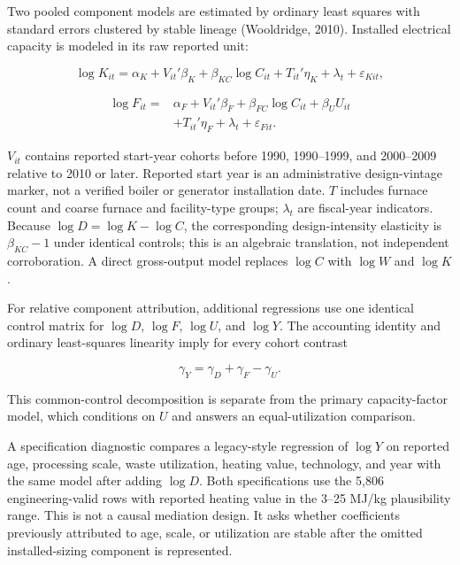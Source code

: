 \documentclass[11pt,letterpaper]{article}
\begin{document}
Two pooled component models are estimated by ordinary least squares with
standard errors clustered by stable lineage (Wooldridge, 2010). Installed
electrical capacity is modeled in its raw reported unit:

\begin{equation}
\log K_{it}=\alpha_K+V_{it}'\beta_K
+\beta_{KC}\log C_{it}+T_{it}'\eta_K
+\lambda_t+\varepsilon_{Kit},
\label{eq:design-model}
\end{equation}

\begin{equation}
\begin{split}
\log F_{it}={}&\alpha_F+V_{it}'\beta_F
+\beta_{FC}\log C_{it}+\beta_U U_{it}\\
&+T_{it}'\eta_F+\lambda_t+\varepsilon_{Fit}.
\end{split}
\label{eq:factor-model}
\end{equation}

$V_{it}$ contains reported start-year cohorts before 1990,
1990--1999, and 2000--2009 relative to 2010 or later. Reported start year is an
administrative design-vintage marker, not a verified boiler or generator
installation date. $T$ includes furnace count and coarse furnace and
facility-type groups; $\lambda_t$ are fiscal-year indicators. Because
$\log D=\log K-\log C$, the corresponding design-intensity elasticity is
$\beta_{KC}-1$ under identical controls; this is an algebraic translation, not
independent corroboration. A direct gross-output model replaces $\log C$ with
$\log W$ and $\log K$.

For relative component attribution, additional regressions use one identical
control matrix for $\log D$, $\log F$, $\log U$, and $\log Y$. The accounting
identity and ordinary least-squares linearity imply for every cohort contrast

\begin{equation}
\gamma_Y=\gamma_D+\gamma_F-\gamma_U.
\label{eq:common-component}
\end{equation}

This common-control decomposition is separate from the primary capacity-factor
model, which conditions on $U$ and answers an equal-utilization comparison.

A specification diagnostic compares a legacy-style regression of $\log Y$ on
reported age, processing scale, waste utilization, heating value, technology,
and year with the same model after adding $\log D$. Both specifications use the
5,806 engineering-valid rows with reported heating value in the 3--25 MJ/kg
plausibility range. This is not a causal mediation design. It asks whether
coefficients previously attributed to age, scale, or utilization are stable
after the omitted installed-sizing component is represented.
\end{document}
